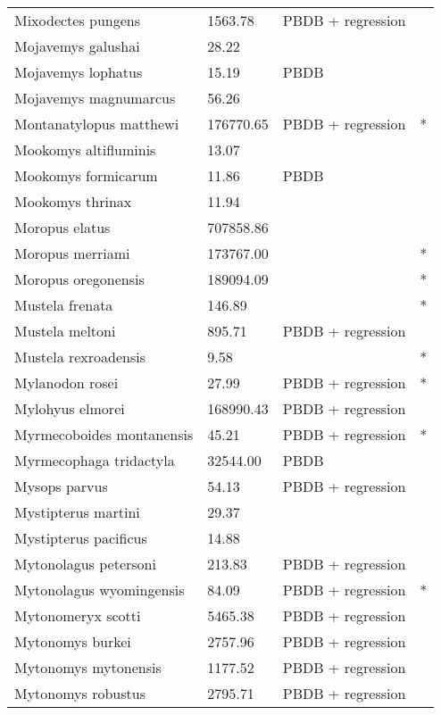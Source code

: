 \documentclass{article}
\begin{document}
\begin{center}
\begin{longtable}{p{} p{} p{} p{}}
    Mixodectes pungens & 1563.78 & PBDB + regression &  \\ 
    Mojavemys galushai & 28.22 & \cite{Tomiya2013} &  \\ 
    Mojavemys lophatus & 15.19 & PBDB &  \\ 
    Mojavemys magnumarcus & 56.26 & \cite{Tomiya2013} &  \\ 
    Montanatylopus matthewi & 176770.65 & PBDB + regression & * \\ 
    Mookomys altifluminis & 13.07 & \cite{Tomiya2013} &  \\ 
    Mookomys formicarum & 11.86 & PBDB &  \\ 
    Mookomys thrinax & 11.94 & \cite{Tomiya2013} &  \\ 
    Moropus elatus & 707858.86 & \cite{Tomiya2013} &  \\ 
    Moropus merriami & 173767.00 & \cite{McKenna2011} & * \\ 
    Moropus oregonensis & 189094.09 & \cite{Tomiya2013} & * \\ 
    Mustela frenata & 146.89 & \cite{Smith2004} & * \\ 
    Mustela meltoni & 895.71 & PBDB + regression &  \\ 
    Mustela rexroadensis & 9.58 & \cite{Tomiya2013} & * \\ 
    Mylanodon rosei & 27.99 & PBDB + regression & * \\ 
    Mylohyus elmorei & 168990.43 & PBDB + regression &  \\ 
    Myrmecoboides montanensis & 45.21 & PBDB + regression & * \\ 
    Myrmecophaga tridactyla & 32544.00 & PBDB &  \\ 
    Mysops parvus & 54.13 & PBDB + regression &  \\ 
    Mystipterus martini & 29.37 & \cite{Tomiya2013} &  \\ 
    Mystipterus pacificus & 14.88 & \cite{Tomiya2013} &  \\ 
    Mytonolagus petersoni & 213.83 & PBDB + regression &  \\ 
    Mytonolagus wyomingensis & 84.09 & PBDB + regression & * \\ 
    Mytonomeryx scotti & 5465.38 & PBDB + regression &  \\ 
    Mytonomys burkei & 2757.96 & PBDB + regression &  \\ 
    Mytonomys mytonensis & 1177.52 & PBDB + regression &  \\ 
    Mytonomys robustus & 2795.71 & PBDB + regression &  \\ 

\end{longtable}
\end{center}
\end{document}
